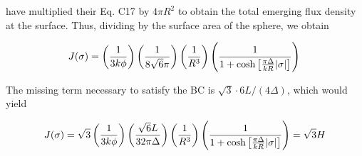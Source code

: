 \documentclass[onecolumn]{aastex63}
\begin{document}
\citet{2006ApJ...649...14D} have multiplied their Eq. C17 by $4\pi R^2$ to obtain the total emerging flux density at the surface. Thus, dividing by the surface area of the sphere, we obtain

\begin{equation}
    J(\sigma) =
    \left(\frac{1}{3k\phi}\right) \left(\frac{1}{8\sqrt{6}\pi}\right)\left(\frac{1}{R^3}\right)\left(\frac{1}{1 + \cosh{\left[\frac{\pi \Delta}{kR}|\sigma|\right]}}\right)\\
\end{equation}

The missing term necessary to satisfy the BC is $\sqrt{3} \cdot 6L/(4\Delta)$, which would yield

\begin{equation}
    J(\sigma) = \sqrt{3}
    \left(\frac{1}{3k\phi}\right) \left(\frac{\sqrt{6}L}{32\pi\Delta}\right)\left(\frac{1}{R^3}\right)\left(\frac{1}{1 + \cosh{\left[\frac{\pi \Delta}{kR}|\sigma|\right]}}\right) = \sqrt{3} H\\
\end{equation}




{}

\end{document}
